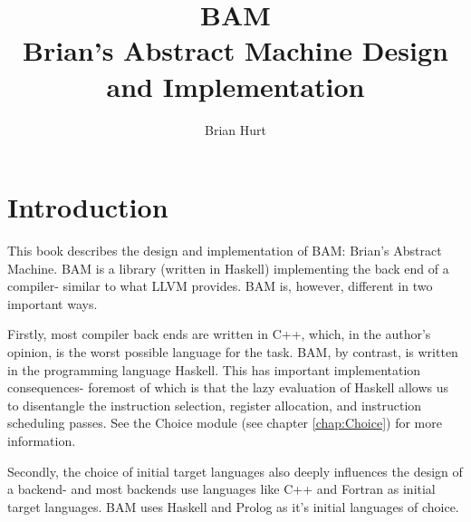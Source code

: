 \documentclass[draft]{book}
\begin{document}
\begin{titlepage}
\title{BAM\\
Brian's Abstract Machine
Design and Implementation}
\author{Brian Hurt}
\maketitle
\end{titlepage}

\tableofcontents
\listoftables
\listoffigures

\chapter{Introduction}

This book describes the design and implementation of BAM: Brian's
Abstract Machine.  BAM is a library (written in Haskell) implementing
the back end of a compiler- similar to what LLVM provides.  BAM is,
however, different in two important ways.

Firstly, most compiler back ends are written in C++, which, in the
author's opinion, is the worst possible language for the task.  BAM, by
contrast, is written in the programming language Haskell.  This has
important implementation consequences- foremost of which is that the
lazy evaluation of Haskell allows us to disentangle the instruction
selection, register allocation, and instruction scheduling passes.  See
the Choice module (see chapter \ref{chap:Choice}) for more information.

Secondly, the choice of initial target languages also deeply influences
the design of a backend- and most backends use languages like C++ and
Fortran as initial target languages.  BAM uses Haskell and Prolog as
it's initial languages of choice.


\end{document}
